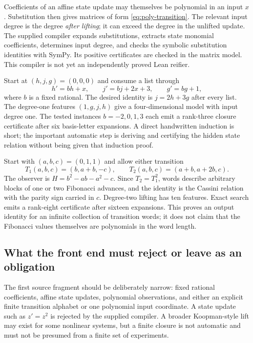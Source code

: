 Coefficients of an affine state update may themselves be polynomial in an
input $x$. Substitution then gives matrices of form \eqref{eq:poly-transition}.
The relevant input degree is the degree \emph{after lifting}; it can exceed the
degree in the unlifted update. The supplied compiler expands substitutions,
extracts state monomial coefficients, determines input degree, and checks the
symbolic substitution identities with SymPy. Its positive certificates are
checked in the matrix model. This compiler is not yet an independently proved
Lean reifier.

\begin{example}\label{ex:horner}
Start at $(h,j,g)=(0,0,0)$ and consume a list through
\[
h'=bh+x,\qquad j'=bj+2x+3,\qquad g'=bg+1,
\]
where $b$ is a fixed rational. The desired identity is $j=2h+3g$ after every
list. The degree-one features $(1,g,j,h)$ give a four-dimensional model with
input degree one. The tested instances $b=-2,0,1,3$ each emit a rank-three
closure certificate after six basis-letter expansions. A direct handwritten
induction is short; the important automatic step is deriving and certifying
the hidden state relation without being given that induction proof.
\end{example}

\begin{example}
Start with $(a,b,c)=(0,1,1)$ and allow either transition
\[
T_1(a,b,c)=(b,a+b,-c),\qquad
T_2(a,b,c)=(a+b,a+2b,c).
\]
The observer is $H=b^2-ab-a^2-c$. Since $T_2=T_1^2$, words describe arbitrary
blocks of one or two Fibonacci advances, and the identity is the Cassini
relation with the parity sign carried in $c$. Degree-two lifting has ten
features. Exact search emits a rank-eight certificate after sixteen expansions.
This proves an output identity for an infinite collection of transition words;
it does not claim that the Fibonacci values themselves are polynomials in the
word length.
\end{example}

\subsection{What the front end must reject or leave as an obligation}

The first source fragment should be deliberately narrow: fixed rational
coefficients, affine state updates, polynomial observations, and either an
explicit finite transition alphabet or one polynomial input coordinate.
A state update such as $z'=z^2$ is rejected by the supplied compiler. A broader
Koopman-style lift may exist for some nonlinear systems, but a finite closure is
not automatic and must not be presumed from a finite set of experiments.

